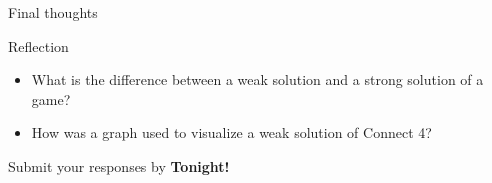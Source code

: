 \documentclass{beamer}
\begin{document}
\begin{frame}{Final thoughts}
  \begin{block}{Reflection}
    \begin{itemize}
\pause
      \item What is the difference between a weak solution and a strong solution of a game?
\pause
      \item How was a graph used to visualize a weak solution of Connect 4?
    \end{itemize}
  \end{block}
\begin{center}
Submit your responses by \textbf{Tonight!}
\end{center}
\end{frame}
\end{document}
